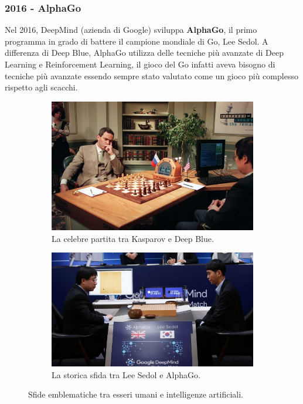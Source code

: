 \subsubsection{2016 - AlphaGo}

Nel 2016, DeepMind (azienda di Google) sviluppa \textbf{AlphaGo}, il primo programma in grado di battere il campione mondiale di Go, Lee Sedol. A differenza di Deep Blue, AlphaGo utilizza delle tecniche più avanzate di Deep Learning e Reinforcement Learning, il gioco del Go infatti aveva bisogno di tecniche più avanzate essendo sempre stato valutato come un gioco più complesso rispetto agli scacchi.

\begin{figure}[htbp]
    \centering
        \begin{subfigure}[b]{0.45\textwidth}
            \centering
            \includegraphics[width=\linewidth]{figure/GKDB.jpg}
            \caption{La celebre partita tra Kasparov e Deep Blue.}
            \label{fig:kasparovAndDeepBlue}
        \end{subfigure}
        \hspace{1cm}
        \begin{subfigure}[b]{0.45\textwidth}
            \centering
            \includegraphics[width=\linewidth]{figure/AGLS.jpg}
            \caption{La storica sfida tra Lee Sedol e AlphaGo.}
            \label{fig:leeSedolAndAlphaGo}
        \end{subfigure}
    \caption{Sfide emblematiche tra esseri umani e intelligenze artificiali.}
    \label{fig:kasparovAndLeeSedol}
\end{figure}

